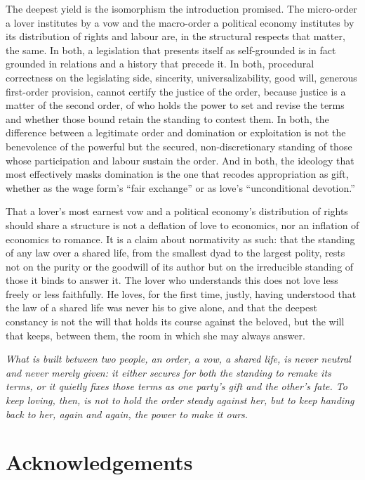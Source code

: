 The deepest yield is the isomorphism the introduction promised. The micro-order a lover institutes by a vow and the macro-order a political economy institutes by its distribution of rights and labour are, in the structural respects that matter, the same. In both, a legislation that presents itself as self-grounded is in fact grounded in relations and a history that precede it. In both, procedural correctness on the legislating side, sincerity, universalizability, good will, generous first-order provision, cannot certify the justice of the order, because justice is a matter of the second order, of who holds the power to set and revise the terms and whether those bound retain the standing to contest them. In both, the difference between a legitimate order and domination or exploitation is not the benevolence of the powerful but the secured, non-discretionary standing of those whose participation and labour sustain the order. And in both, the ideology that most effectively masks domination is the one that recodes appropriation as gift, whether as the wage form's ``fair exchange'' or as love's ``unconditional devotion.''

That a lover's most earnest vow and a political economy's distribution of rights should share a structure is not a deflation of love to economics, nor an inflation of economics to romance. It is a claim about normativity as such: that the standing of any law over a shared life, from the smallest dyad to the largest polity, rests not on the purity or the goodwill of its author but on the irreducible standing of those it binds to answer it. The lover who understands this does not love less freely or less faithfully. He loves, for the first time, justly, having understood that the law of a shared life was never his to give alone, and that the deepest constancy is not the will that holds its course against the beloved, but the will that keeps, between them, the room in which she may always answer.

\medskip
{\color{warnred}\itshape What is built between two people, an order, a vow, a shared life, is never neutral and never merely given: it either secures for both the standing to remake its terms, or it quietly fixes those terms as one party's gift and the other's fate. To keep loving, then, is not to hold the order steady against her, but to keep handing back to her, again and again, the power to make it ours.}

\section*{Acknowledgements}

